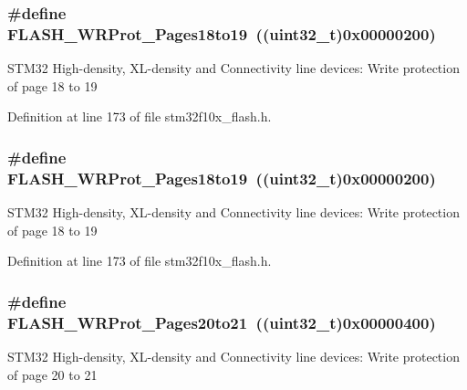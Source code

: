 \subsubsection[{\texorpdfstring{F\+L\+A\+S\+H\+\_\+\+W\+R\+Prot\+\_\+\+Pages18to19}{FLASH_WRProt_Pages18to19}}]{\setlength{\rightskip}{0pt plus 5cm}\#define F\+L\+A\+S\+H\+\_\+\+W\+R\+Prot\+\_\+\+Pages18to19~(({\bf uint32\+\_\+t})0x00000200)}\hypertarget{group___option___bytes___write___protection_ga856fdcf3d41edc73902fcf93a1e375d9}{}\label{group___option___bytes___write___protection_ga856fdcf3d41edc73902fcf93a1e375d9}
S\+T\+M32 High-\/density, X\+L-\/density and Connectivity line devices\+: Write protection of page 18 to 19 

Definition at line 173 of file stm32f10x\+\_\+flash.\+h.

\subsubsection[{\texorpdfstring{F\+L\+A\+S\+H\+\_\+\+W\+R\+Prot\+\_\+\+Pages18to19}{FLASH_WRProt_Pages18to19}}]{\setlength{\rightskip}{0pt plus 5cm}\#define F\+L\+A\+S\+H\+\_\+\+W\+R\+Prot\+\_\+\+Pages18to19~(({\bf uint32\+\_\+t})0x00000200)}\hypertarget{group___option___bytes___write___protection_ga856fdcf3d41edc73902fcf93a1e375d9}{}\label{group___option___bytes___write___protection_ga856fdcf3d41edc73902fcf93a1e375d9}
S\+T\+M32 High-\/density, X\+L-\/density and Connectivity line devices\+: Write protection of page 18 to 19 

Definition at line 173 of file stm32f10x\+\_\+flash.\+h.

\subsubsection[{\texorpdfstring{F\+L\+A\+S\+H\+\_\+\+W\+R\+Prot\+\_\+\+Pages20to21}{FLASH_WRProt_Pages20to21}}]{\setlength{\rightskip}{0pt plus 5cm}\#define F\+L\+A\+S\+H\+\_\+\+W\+R\+Prot\+\_\+\+Pages20to21~(({\bf uint32\+\_\+t})0x00000400)}\hypertarget{group___option___bytes___write___protection_ga09215d5d245c8f5cd664c5cc4ff9fb69}{}\label{group___option___bytes___write___protection_ga09215d5d245c8f5cd664c5cc4ff9fb69}
S\+T\+M32 High-\/density, X\+L-\/density and Connectivity line devices\+: Write protection of page 20 to 21 


